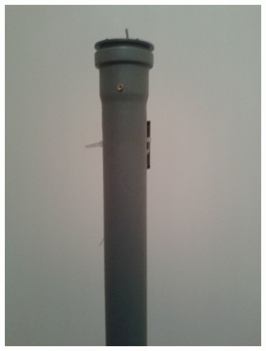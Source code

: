 \documentclass[11pt,a4paper, twoside]{article}
\begin{document}
\begin{figure}[H]
\begin{center}
\includegraphics[scale=0.10]{./img/laser2.jpg}

\end{center}
\end{figure}
\end{document}
